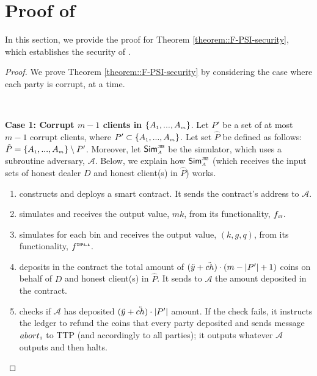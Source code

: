 

\section{Proof of \fpsi}\label{sec::F-PSI-proof}

In this section, we provide the proof for Theorem \ref{theorem::F-PSI-security}, which establishes the security of \fpsi. 


\begin{proof}
%
We prove Theorem  \ref{theorem::F-PSI-security} by considering the case where each party is corrupt, at a time.

\

\noindent\textbf{Case 1: Corrupt $m-1$ clients in $\{  {  A}_{ \scriptscriptstyle {   1}}, ...,   {  A}_{ \scriptscriptstyle {   m}}\}$}.  Let $P'$ be a set of at most $m-1$ corrupt clients, where $P'\subset \{  {  A}_{ \scriptscriptstyle {   1}}, ...,   {  A}_{ \scriptscriptstyle {   m}}\}$. Let set $\hat P$ be defined as follows: $\hat P=\{  {  A}_{ \scriptscriptstyle {   1}}, ...,   {  A}_{ \scriptscriptstyle {   m}}\}\setminus P'$. Moreover, let $\mathsf{Sim}^{\scriptscriptstyle\mathtt{JUS}}_{\scriptscriptstyle A}$ be the simulator, which uses a subroutine adversary, $\mathcal{A}$.  Below, we explain how $\mathsf{Sim}^{\scriptscriptstyle \mathtt{JUS}}_{\scriptscriptstyle A}$ (which receives the input sets of honest dealer $D$ and honest client(s) in $\hat P$) works. 


\begin{enumerate}
%
\item constructs and deploys a smart contract. It sends the contract's address to $\mathcal{A}$. 
%
\item simulates \ct and receives the output value, $ {mk}$, from its functionality, $f_{\scriptscriptstyle \mathtt{CT}}$.
%
\item\label{sim::ZSPA-A-invocation} simulates \zspaa for each bin and receives the output value, $( k,  g,  q)$, from its functionality, $f^{\scriptscriptstyle \mathtt{ZSPA\text{-}A}}$.
%
\item deposits in the contract the total amount of $(\ddot{y}+\ddot{ch})\cdot (m-|P'|+1)$ coins on behalf of $D$ and honest client(s) in $\hat P$. It sends to $\mathcal{A}$ the amount deposited in the contract. 
%
\item checks if $\mathcal{A}$ has deposited $(\ddot{y}+\ddot{ch})\cdot |P'|$ amount. If the check fails, it instructs the ledger to refund the coins that every party deposited and sends message $abort_{\scriptscriptstyle 1}$ to TTP (and accordingly to all parties); it outputs whatever $\mathcal{A}$ outputs and then halts. 


\end{enumerate}
\end{proof}
